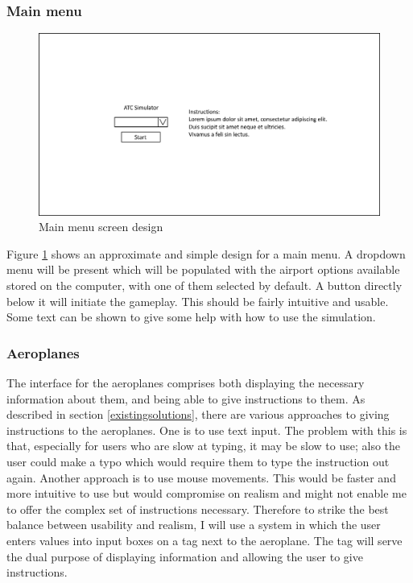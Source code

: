 \documentclass{article}
\begin{document}
\subsubsection{Main menu}
\begin{figure}[H]
\centering
\includegraphics[width=\textwidth]{diagrams/mainmenu.png}
\caption{\label{fig:main_menu_design}Main menu screen design}
\end{figure}

Figure \ref{fig:main_menu_design} shows an approximate and simple design for a main menu.
A dropdown menu will be present which will be populated with the airport options available stored on the computer, with one of them selected by default.
A button directly below it will initiate the gameplay.
This should be fairly intuitive and usable.
Some text can be shown to give some help with how to use the simulation.

\subsubsection{Aeroplanes}
The interface for the aeroplanes comprises both displaying the necessary information about them, and being able to give instructions to them.
As described in section \ref{existingsolutions}, there are various approaches to giving instructions to the aeroplanes.
One is to use text input.
The problem with this is that, especially for users who are slow at typing, it may be slow to use; also the user could make a typo which would require them to type the instruction out again.
Another approach is to use mouse movements.
This would be faster and more intuitive to use but would compromise on realism and might not enable me to offer the complex set of instructions necessary.
Therefore to strike the best balance between usability and realism, I will use a system in which the user enters values into input boxes on a tag next to the aeroplane.
The tag will serve the dual purpose of displaying information and allowing the user to give instructions.
\end{document}
